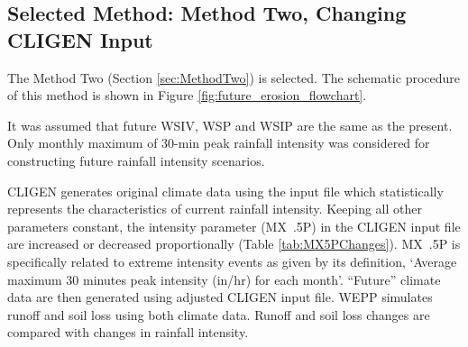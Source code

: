 \subsection{Selected Method: Method Two, Changing CLIGEN Input}
\label{sec:SelectedMethod}

The Method Two (Section \ref{sec:MethodTwo}) is selected. The schematic
procedure of this method is shown in Figure \ref{fig:future_erosion_flowchart}.

It was assumed that future WSIV, WSP and WSIP are the same as the present. Only
monthly maximum of 30-min peak rainfall intensity was considered for
constructing future rainfall intensity scenarios.

CLIGEN generates original climate data using the input file which statistically
represents the characteristics of current rainfall intensity. Keeping all other
parameters constant, the intensity parameter (MX~.5P) in the CLIGEN input file
are increased or decreased proportionally (Table \ref{tab:MX5PChanges}).
MX~.5P is specifically related to extreme intensity events as given by its
definition, `Average maximum 30 minutes peak intensity (in/hr) for each month'.
``Future'' climate data are then generated using adjusted CLIGEN input file.
WEPP simulates runoff and soil loss using both climate data. Runoff and soil
loss changes are compared with changes in rainfall intensity.

